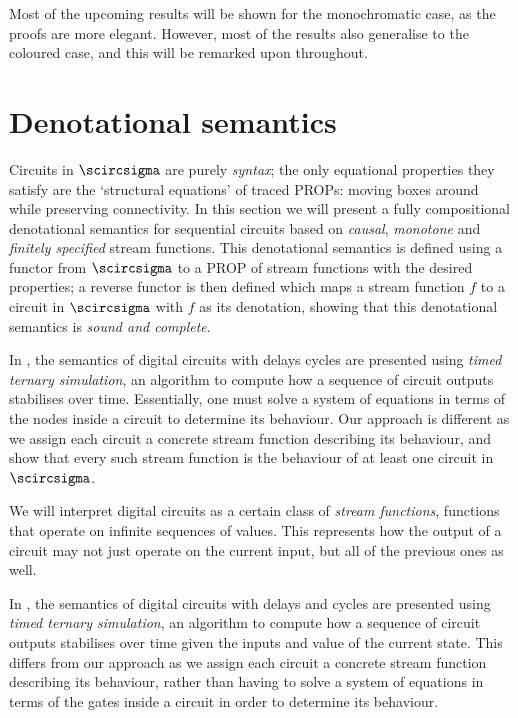 \documentclass{lmcs}
\begin{document}
Most of the upcoming results will be shown for the monochromatic case, as the
proofs are more elegant.
However, most of the results also generalise to the coloured case, and this will
be remarked upon throughout.

\section{Denotational semantics}

Circuits in \(\scircsigma\) are purely \emph{syntax}; the only equational
properties they satisfy are the `structural equations' of traced PROPs: moving
boxes around while preserving connectivity.
In this section we will present a fully compositional denotational
semantics for sequential circuits based on \emph{causal}, \emph{monotone} and
\emph{finitely specified} stream functions.
This denotational semantics is defined using a functor from \(\scircsigma\) to a
PROP of stream functions with the desired properties; a reverse functor is then
defined which maps a stream function \(f\) to a circuit in \(\scircsigma\) with
\(f\) as its denotation, showing that this denotational semantics is
\emph{sound and complete}.

\begin{rem}
    In \cite{mendler2012constructive}, the semantics of digital circuits with
    delays cycles are presented using \emph{timed ternary simulation}, an
    algorithm to compute how a sequence of circuit outputs stabilises over time.
    Essentially, one must solve a system of equations in terms of the nodes
    inside a circuit to determine its behaviour.
    Our approach is different as we assign each circuit a concrete stream
    function describing its behaviour, and show that every such stream function
    is the behaviour of at least one circuit in \(\scircsigma\).
\end{rem}

We will interpret digital circuits as a certain class of
\emph{stream functions}, functions that operate on infinite sequences of values.
This represents how the output of a circuit may not just operate on the current
input, but all of the previous ones as well.

\begin{rem}
    In \cite{mendler2012constructive}, the semantics of digital circuits with
    delays and cycles are presented using \emph{timed ternary simulation}, an
    algorithm to compute how a sequence of circuit outputs stabilises over time
    given the inputs and value of the current state.
    This differs from our approach as we assign each circuit a concrete stream
    function describing its behaviour, rather than having to solve a system of
    equations in terms of the gates inside a circuit in order to determine its
    behaviour.
\end{rem}
\end{document}
